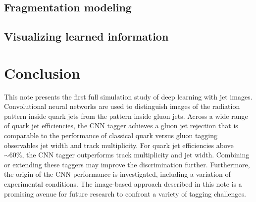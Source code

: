 \documentclass[UKenglish,texlive=2016,PUB,coverpage]{\ATLASLATEXPATH atlasdoc}
\begin{document}


\subsection{Fragmentation modeling}
\label{sec:frag}



\subsection{Visualizing learned information}
\label{sec:learningaboutlearning}




%


 \FloatBarrier


\section{Conclusion}
\label{sec:conclusion}

This note presents the first full simulation study of deep learning with jet images.  Convolutional neural networks are used to distinguish images of the radiation pattern inside quark jets from the pattern inside gluon jets.  Across a wide range of quark jet efficiencies, the CNN tagger achieves a gluon jet rejection that is comparable to the performance of classical quark versus gluon tagging observables jet width and track multiplicity.  For quark jet efficiencies above $\sim 60\%$, the CNN tagger outperforms track multiplicity and jet width.  Combining or extending these taggers may improve the discrimination further.  Furthermore, the origin of the CNN performance is investigated, including a variation of experimental conditions.  The image-based approach described in this note is a promising avenue for future research to confront a variety of tagging challenges.
\end{document}
